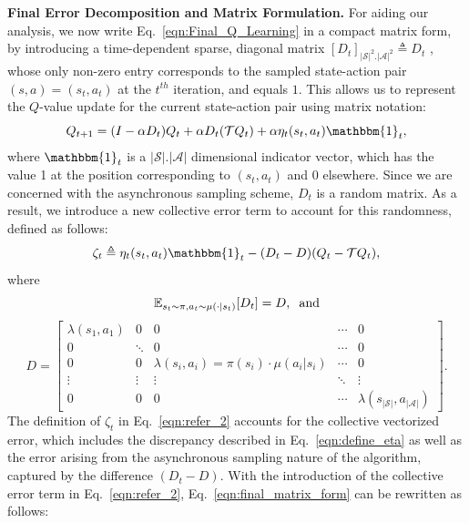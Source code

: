 \documentclass{article}
\begin{document}
\textbf{Final Error Decomposition and Matrix Formulation.} For aiding our analysis, we now write Eq.~\eqref{eqn:Final_Q_Learning} in a compact matrix form, by introducing a time-dependent sparse, diagonal matrix $[D_t]_{\lvert\mathcal{S}\rvert^2.\lvert\mathcal{A}\rvert^2} \triangleq D_t$ , whose only non-zero entry corresponds to the sampled state-action pair \((s,a)=(s_t,a_t)\) at the \(t^{th}\) iteration, and equals $1$. This allows us to represent the \(Q\)-value update for the current state-action pair using matrix notation:
\begin{equation} \label{eqn:final_matrix_form}
    Q_{t+1} = (I - \alpha D_t) Q_t + \alpha D_t (\mathcal{T}Q_t) + \alpha \eta_t(s_t, a_t) \mathbbm{1}_t,
\end{equation}
where \(\mathbbm{1}_{t}\) is a $\lvert\mathcal{S}\rvert.\lvert\mathcal{A}\rvert$ dimensional indicator vector, which has the value 1 at the position corresponding to \((s_t, a_t)\) and 0 elsewhere. Since we are concerned with the asynchronous sampling scheme, \(D_t\) is a random matrix. As a result, we introduce a new collective error term to account for this randomness, defined as follows:
\begin{equation}\label{eqn:refer_2}
    \zeta_t \triangleq \eta_t(s_t, a_t) \mathbbm{1}_t - (D_t - D)(Q_t - \mathcal{T}Q_t),
\end{equation}
where
\begin{equation}\label{eqn:D}
\mathbb{E}_{s_t \sim \pi, a_t \sim \mu(\cdot\lvert s_t)}[D_t] = D, \hspace{2mm} \textrm{and}
\end{equation}
\begin{equation}
\label{eqn:matrix}
D = 
\begin{bmatrix}
\lambda(s_1,a_1) & 0 & 0 & \cdots & 0 \\
0 & \ddots & 0 & \cdots & 0 \\
0 & 0 & \lambda(s_i,a_i) = \pi(s_i)\cdot \mu(a_i|s_i)& \cdots & 0 \\
\vdots & \vdots & \vdots & \ddots & \vdots \\
0 & 0 & 0 & \cdots & \lambda(s_{|\mathcal{S}|},a_{|\mathcal{A}|}) 
\end{bmatrix}. 
\end{equation}
The definition of \(\zeta_t\) in Eq.~\eqref{eqn:refer_2} accounts for the collective vectorized error, which includes the discrepancy described in Eq.~\eqref{eqn:define_eta} as well as the error arising from the asynchronous sampling nature of the algorithm, captured by the difference \((D_t - D)\). With the introduction of the collective error term in Eq.~\eqref{eqn:refer_2}, Eq.~\eqref{eqn:final_matrix_form} can be rewritten as follows:
\end{document}
